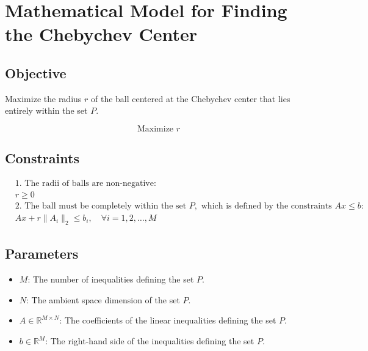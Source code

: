 \documentclass{article}
\begin{document}
\section*{Mathematical Model for Finding the Chebychev Center}

\subsection*{Objective}
Maximize the radius \( r \) of the ball centered at the Chebychev center that lies entirely within the set \( P \).

\[
\text{Maximize } r
\]

\subsection*{Constraints}
\begin{align}
& \text{1. The radii of balls are non-negative:} \\
& r \geq 0 \\
& \text{2. The ball must be completely within the set } P, \text{ which is defined by the constraints } Ax \leq b: \\
& A x + r \|A_i\|_2 \leq b_i, \quad \forall i = 1, 2, \ldots, M
\end{align}

\subsection*{Parameters}
\begin{itemize}
    \item \( M \): The number of inequalities defining the set \( P \).
    \item \( N \): The ambient space dimension of the set \( P \).
    \item \( A \in \mathbb{R}^{M \times N} \): The coefficients of the linear inequalities defining the set \( P \).
    \item \( b \in \mathbb{R}^{M} \): The right-hand side of the inequalities defining the set \( P \).
\end{itemize}
\end{document}
